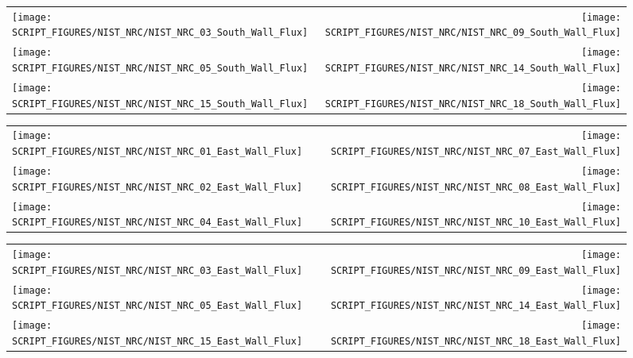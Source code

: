 \begin{figure}[!ht]
\begin{tabular*}{\textwidth}{l@{\extracolsep{\fill}}r}
\texttt{[image: SCRIPT\_FIGURES/NIST\_NRC/NIST\_NRC\_03\_South\_Wall\_Flux]} &
\texttt{[image: SCRIPT\_FIGURES/NIST\_NRC/NIST\_NRC\_09\_South\_Wall\_Flux]} \\
\texttt{[image: SCRIPT\_FIGURES/NIST\_NRC/NIST\_NRC\_05\_South\_Wall\_Flux]} &
\texttt{[image: SCRIPT\_FIGURES/NIST\_NRC/NIST\_NRC\_14\_South\_Wall\_Flux]} \\
\texttt{[image: SCRIPT\_FIGURES/NIST\_NRC/NIST\_NRC\_15\_South\_Wall\_Flux]} &
\texttt{[image: SCRIPT\_FIGURES/NIST\_NRC/NIST\_NRC\_18\_South\_Wall\_Flux]}
\end{tabular*}
\label{NIST_NRC_South_Wall_Flux_Open}
\end{figure}


\begin{figure}[!ht]
\begin{tabular*}{\textwidth}{l@{\extracolsep{\fill}}r}
\texttt{[image: SCRIPT\_FIGURES/NIST\_NRC/NIST\_NRC\_01\_East\_Wall\_Flux]} &
\texttt{[image: SCRIPT\_FIGURES/NIST\_NRC/NIST\_NRC\_07\_East\_Wall\_Flux]} \\
\texttt{[image: SCRIPT\_FIGURES/NIST\_NRC/NIST\_NRC\_02\_East\_Wall\_Flux]} &
\texttt{[image: SCRIPT\_FIGURES/NIST\_NRC/NIST\_NRC\_08\_East\_Wall\_Flux]} \\
\texttt{[image: SCRIPT\_FIGURES/NIST\_NRC/NIST\_NRC\_04\_East\_Wall\_Flux]} &
\texttt{[image: SCRIPT\_FIGURES/NIST\_NRC/NIST\_NRC\_10\_East\_Wall\_Flux]}
\end{tabular*}
\label{NIST_NRC_East_Wall_Flux_Closed}
\end{figure}

\begin{figure}[!ht]
\begin{tabular*}{\textwidth}{l@{\extracolsep{\fill}}r}
\texttt{[image: SCRIPT\_FIGURES/NIST\_NRC/NIST\_NRC\_03\_East\_Wall\_Flux]} &
\texttt{[image: SCRIPT\_FIGURES/NIST\_NRC/NIST\_NRC\_09\_East\_Wall\_Flux]} \\
\texttt{[image: SCRIPT\_FIGURES/NIST\_NRC/NIST\_NRC\_05\_East\_Wall\_Flux]} &
\texttt{[image: SCRIPT\_FIGURES/NIST\_NRC/NIST\_NRC\_14\_East\_Wall\_Flux]} \\
\texttt{[image: SCRIPT\_FIGURES/NIST\_NRC/NIST\_NRC\_15\_East\_Wall\_Flux]} &
\texttt{[image: SCRIPT\_FIGURES/NIST\_NRC/NIST\_NRC\_18\_East\_Wall\_Flux]}
\end{tabular*}
\label{NIST_NRC_East_Wall_Flux_Open}
\end{figure}

